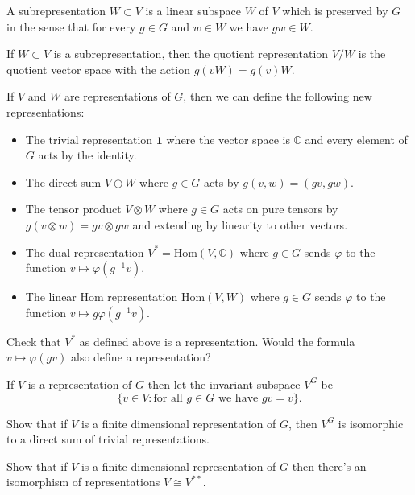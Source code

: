 \documentclass[11pt]{article}
\begin{document}
\begin{definition}
A subrepresentation $W \subset V$ is a linear subspace $W$ of $V$ which is preserved by $G$ in the sense that for every $g \in G$ and $w \in W$ we have $gw \in W$.

If $W \subset V$ is a subrepresentation, then the quotient representation $V/W$ is the quotient vector space with the action $g(vW) = g(v)W$.
\end{definition}

\begin{definition}
If $V$ and $W$ are representations of $G$, then we can define the following new representations:
\begin{itemize}
\item The trivial representation $\mathbf{1}$ where the vector space is $\mathbb{C}$ and every element of $G$ acts by the identity.
\item The direct sum $V \oplus W$ where $g \in G$ acts by $g(v,w) = (gv,gw)$.
\item The tensor product $V \otimes W$ where $g \in G$ acts on pure tensors by $g(v \otimes w) = g v \otimes g w$ and extending by linearity to other vectors.
\item The dual representation $V^* = \mathrm{Hom}(V,\mathbb{C})$ where $g \in G$ sends $\varphi$ to the function $v \mapsto \varphi(g^{-1}v)$.
\item The linear Hom representation $\mathrm{Hom}(V,W)$ where $g \in G$ sends $\varphi$ to the function $v \mapsto g \varphi(g^{-1} v)$.
\end{itemize}
\end{definition}

\begin{exercise}
Check that $V^*$ as defined above is a representation.  Would the formula $v \mapsto \varphi(gv)$ also define a representation?
\end{exercise}

\begin{definition}
If $V$ is a representation of $G$ then let the invariant subspace $V^G$ be  
$$\{v \in V: \text{for all $g \in G$ we have } g v = v\}.$$
\end{definition}

\begin{exercise}
Show that if $V$ is a finite dimensional representation of $G$, then $V^G$ is isomorphic to a direct sum of trivial representations.
\end{exercise}

\begin{exercise}
Show that if $V$ is a finite dimensional representation of $G$ then there's an isomorphism of representations $V \cong V^{**}$.
\end{exercise}
\end{document}
